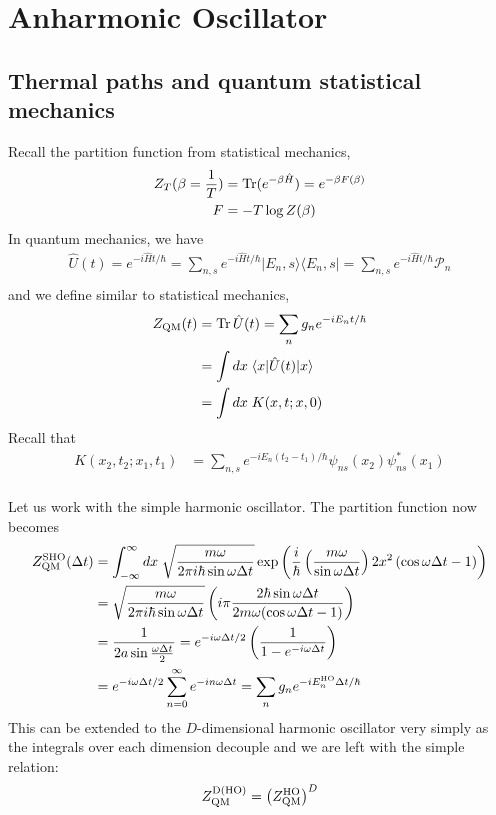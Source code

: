 \section{Anharmonic Oscillator}
\subsection{Thermal paths and quantum statistical mechanics}

Recall the partition function from statistical mechanics,
\begin{align*}
    Z_T(\beta=\frac{1}{T})&=\operatorname{Tr}(e^{-\beta\hat{H}})=e^{-\beta F(\beta)}\\
    F&=-T\log Z(\beta)
\end{align*}
In quantum mechanics, we have
\begin{align*}
    \hat{U}(t)=e^{-i\hat{H}t/\hbar}=\sum_{n,s}e^{-i\hat{H}t/\hbar}|E_n,s\rangle\langle E_n,s|=\sum_{n,s}e^{-i\hat{H}t/\hbar}\mathcal{P}_n\\
\end{align*}
and we define similar to statistical mechanics,
\begin{align*}
    Z_{\rm QM}(t)&=\operatorname{Tr} \hat{U}(t)=\sum_n g_ne^{-iE_nt/\hbar}\\
    &=\int dx\;\langle x| \hat{U}(t) | x \rangle\\
    &= \int dx \; K(x, t; x, 0)
\end{align*}
Recall that
\begin{align*}
    K(x_2,t_2;x_1,t_1)&=\sum_{n,s}e^{-iE_n (t_2-t_1)/\hbar}\psi_{ns}(x_2)\psi^*_{ns}(x_1)\\
\end{align*}

Let us work with the simple harmonic oscillator. The partition function now becomes
\begin{align*}
    Z_{\rm QM}^{\rm SHO}(\Delta t)&=\int_{-\infty}^\infty dx\; \sqrt{\frac{m\omega}{2\pi i \hbar \sin\omega \Delta t}}\exp\left(\frac{i}{\hbar}\left( \frac{m\omega}{\sin\omega\Delta t} \right)2x^2\left( \cos\omega\Delta t - 1 \right)\right)\\
    &=\sqrt{\frac{m\omega}{2\pi i \hbar \sin\omega\Delta t}}\left( i\pi \frac{2\hbar\sin\omega\Delta t}{2m\omega(\cos\omega\Delta t -1) } \right)\\
    &=\frac{1}{2a\sin\frac{\omega\Delta t}{2}}=e^{-i\omega\Delta t/2}\left( \frac{1}{1-e^{-i\omega\Delta t}} \right)\\
    &=e^{-i\omega\Delta t/2}\sum_{n=0}^\infty e^{-in\omega \Delta t}=\sum_n g_ne^{-iE_n^{\rm HO}\Delta t/\hbar}
\end{align*}
This can be extended to the $D$-dimensional harmonic oscillator very simply as the integrals over each dimension decouple and we are left with the simple relation:
\begin{align*}
    Z_{\rm QM}^{\rm D(HO)}=\left( Z_{\rm QM}^{\rm HO} \right)^D
\end{align*}

